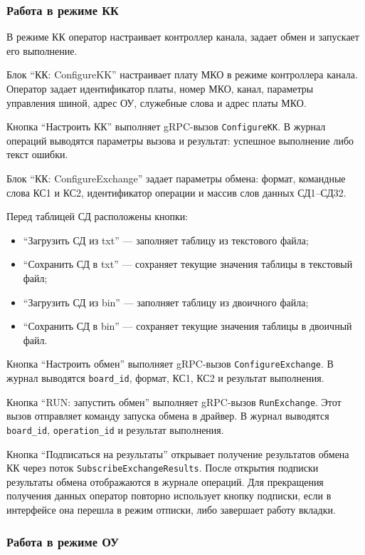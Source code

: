 \subsubsection{Работа в режиме КК}

В режиме КК оператор настраивает контроллер канала, задает обмен и запускает его выполнение.

Блок ``КК: ConfigureKK'' настраивает плату МКО в режиме контроллера канала. Оператор задает идентификатор платы, номер МКО, канал, параметры управления шиной, адрес ОУ, служебные слова и адрес платы МКО.

Кнопка ``Настроить КК'' выполняет gRPC-вызов \texttt{ConfigureKK}. В журнал операций выводятся параметры вызова и результат: успешное выполнение либо текст ошибки.

Блок ``КК: ConfigureExchange'' задает параметры обмена: формат, командные слова КС1 и КС2, идентификатор операции и массив слов данных СД1--СД32.

Перед таблицей СД расположены кнопки:

\begin{itemize}
	\item ``Загрузить СД из txt'' --- заполняет таблицу из текстового файла;
	\item ``Сохранить СД в txt'' --- сохраняет текущие значения таблицы в текстовый файл;
	\item ``Загрузить СД из bin'' --- заполняет таблицу из двоичного файла;
	\item ``Сохранить СД в bin'' --- сохраняет текущие значения таблицы в двоичный файл.
\end{itemize}

Кнопка ``Настроить обмен'' выполняет gRPC-вызов \texttt{ConfigureExchange}. В журнал выводятся \texttt{board\_id}, формат, КС1, КС2 и результат выполнения.

Кнопка ``RUN: запустить обмен'' выполняет gRPC-вызов \texttt{RunExchange}. Этот вызов отправляет команду запуска обмена в драйвер. В журнал выводятся \texttt{board\_id}, \texttt{operation\_id} и результат выполнения.

Кнопка ``Подписаться на результаты'' открывает получение результатов обмена КК через поток \texttt{SubscribeExchangeResults}. После открытия подписки результаты обмена отображаются в журнале операций. Для прекращения получения данных оператор повторно использует кнопку подписки, если в интерфейсе она перешла в режим отписки, либо завершает работу вкладки.

\subsubsection{Работа в режиме ОУ}

